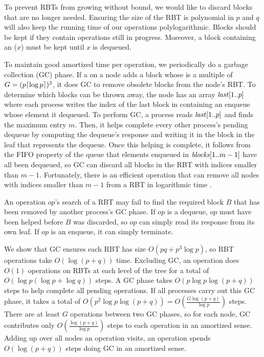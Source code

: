 To prevent RBTs from growing without bound, we would like to discard
blocks that are no longer needed.
Ensuring the size of the RBT is polynomial in $p$ and $q$ will 
also keep the running time of our operations polylogarithmic.
Blocks should be kept if they contain operations still in progress.
Moreover, a block containing an ($x$) must be kept until $x$ is dequeued.

To maintain good amortized time per operation, we periodically do a garbage collection (GC) phase.
If a  on a node adds a block whose  is a multiple of $G=(p\lceil \log p \rceil)^2$, it does GC to remove obsolete blocks from the node's RBT.
To determine which blocks can be thrown away, the node has an array $\mbox{\textnormal{\textit{last}}}[1..p]$ where 
each process writes the index of the last block in
containing an enqueue whose element it dequeued.
To perform GC, a process reads $\mbox{\textnormal{\textit{last}}}[1..p]$ and finds the maximum entry $m$.
Then, it helps complete every other process's pending dequeue 
by computing the dequeue's response and writing it in the block in the leaf that represents the dequeue.
Once this helping is complete, it follows from the FIFO property of the queue that elements enqueued 
in $\mbox{\textit{blocks}}[1..m-1]$ have all been dequeued, so GC can discard all blocks in the RBT 
with indices smaller than $m-1$.
Fortunately, there is an efficient  operation that can remove
all nodes with indices smaller than $m-1$ from a RBT in logarithmic time \cite[Sec.~4.2]{Tar83}.

An operation $op$'s search of a RBT may fail to find the required block $B$ that has been removed 
by another process's GC phase.  If $op$
is a dequeue, $op$ must have been helped before $B$ was discarded, so $op$ can simply read its response from
its own leaf.  If $op$ is an enqueue, it can simply terminate.

We show that GC ensures each RBT has size $O(pq+p^3\log p)$, so RBT operations take $O(\log(p+q))$ time.
Excluding GC, an operation does $O(1)$ operations on RBTs at each level of the tree for a total of
$O(\log p(\log p +\log q))$ steps.
A GC phase takes $O(p\log p \log(p+q))$ steps to help complete all pending operations.
If all processes carry out this GC phase, it takes a total of $O(p^2\log p\log(p+q))=O(\frac{G\log(p+q)}{\log p})$ steps.
There are at least $G$ operations between two GC phases,  so for each node,
GC  contributes only $O(\frac{\log(p+q)}{\log p})$ steps to each operation in an amortized sense.
Adding up over all nodes an operation visits, 
an operation spends $O(\log(p+q))$ steps doing GC in an amortized sense.

